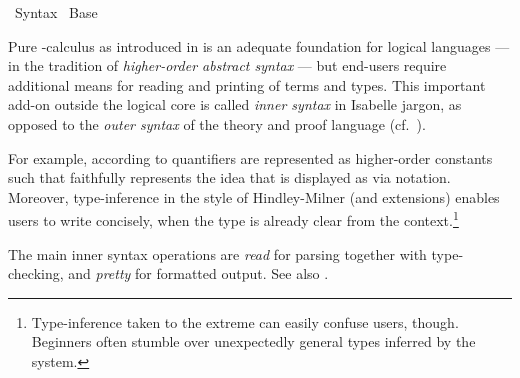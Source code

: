 %
\begin{isabellebody}%
\def\isabellecontext{Syntax}%
%
\isadelimtheory
%
\endisadelimtheory
%
\isatagtheory
{}\isamarkupfalse%
\ Syntax\isanewline
{}\ Base\isanewline
{}%
\endisatagtheory
{\isafoldtheory}%
%
\isadelimtheory
%
\endisadelimtheory
%
\isamarkuptrue%
%
\begin{isamarkuptext}%
Pure -calculus as introduced in  is
  an adequate foundation for logical languages --- in the tradition of
  \emph{higher-order abstract syntax} --- but end-users require
  additional means for reading and printing of terms and types.  This
  important add-on outside the logical core is called \emph{inner
  syntax} in Isabelle jargon, as opposed to the \emph{outer syntax} of
  the theory and proof language (cf.\ ).

  For example, according to \cite{church40} quantifiers are
  represented as higher-order constants  such that  faithfully represents
  the idea that is displayed as  via \hyperlink{keyword.binder}{\mbox{}} notation.  Moreover, type-inference in the style of
  Hindley-Milner \cite{hindleymilner} (and extensions) enables users
  to write  concisely, when the type  is
  already clear from the context.\footnote{Type-inference taken to the
  extreme can easily confuse users, though.  Beginners often stumble
  over unexpectedly general types inferred by the system.}

  \medskip The main inner syntax operations are \emph{read} for
  parsing together with type-checking, and \emph{pretty} for formatted
  output.  See also .


\end{isamarkuptext}
\end{isabellebody}
